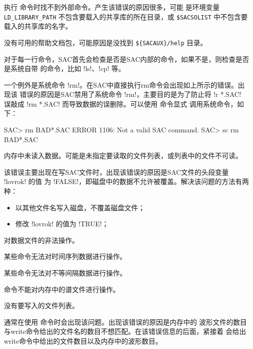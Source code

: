 执行  命令时找不到外部命令。产生该错误的原因很多，可能
是环境变量 \verb|LD_LIBRARY_PATH| 不包含要载入的共享库的所在目录，或
\verb|$SACSOLIST| 中不包含要载入的共享库的名字。

没有可用的帮助文档包，可能原因是没找到 \verb|${SACAUX}/help| 目录。

对于每一行命令，SAC首先会检查是否是SAC内部的命令，如果不是，则检查是否是系统自带
的命令，比如 !ls!、!cp! 等。

一个例外是系统命令 !rm!。在SAC中直接执行rm命令会出现如上所示的错误。出现该
错误的原因是SAC禁用了系统命令 !rm!，主要目的是为了防止将 !r *.SAC! 误敲成
!rm *.SAC! 而导致数据的误删除。可以使用  命令显式
调用系统命令，如下：
\begin{SACCode}
SAC> rm BAD*.SAC
 ERROR 1106: Not a valid SAC command.
SAC> sc rm BAD*.SAC
\end{SACCode}

内存中未读入数据。可能是未指定要读取的文件列表，或列表中的文件不可读。

该错误主要出现在写SAC文件时，出现该错误的原因是SAC文件的头段变量 !lovrok! 的值
为 !FALSE!，即磁盘中的数据不允许被覆盖。解决该问题的方法有两种：
\begin{itemize}
\item 以其他文件名写入磁盘，不覆盖磁盘文件；
\item 修改 !lovrok! 的值为 !TRUE!；
\end{itemize}

对数据文件的非法操作。

某些命令无法对时间序列数据进行操作。

某些命令无法对不等间隔数据进行操作。

命令不能对内存中的谱文件进行操作。

没有要写入的文件列表。

通常在使用  命令时会出现该问题。出现该错误的原因是内存中的
波形文件的数目与write命令给出的文件名的数目不想匹配。在该错误信息的后面，紧接着
会给出write命令中给出的文件数目以及内存中的波形数目。

